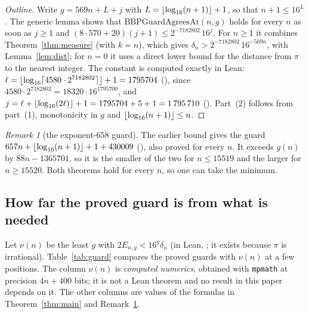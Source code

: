\documentclass[11pt]{amsart}
\theoremstyle{definition}
\theoremstyle{remark}
\newtheorem{remark}[theorem]{Remark}
\newcommand{\Eng}{E_{n,g}}
\newcommand{\dist}{\delta}
\newcommand{\need}{\nu}
\DeclarePairedDelimiter{\floor}{\lfloor}{\rfloor}
\newcommand{\Bconst}{1\,795\,710}
\begin{document}
\begin{proof}[Outline]
Write $g=569n+L+j$ with $L=\floor{\log_{16}(n+1)}+1$, so that
$n+1\le16^L$. The generic lemma  shows that
$\mathrm{BBPGuardAgreesAt}(n,g)$ holds for every $n$ as soon as $j\ge1$ and
$(8\cdot570+20)(j+1)\le2^{-7182802}\,16^{j}$. For $n\ge1$ it combines
Theorem~\ref{thm:measure} (with $k=n$), which gives
$\dist_n>2^{-7182802}\,16^{-569n}$, with Lemma~\ref{lem:dist}; for $n=0$ it
uses a direct lower bound for the distance from $\pi$ to the nearest
integer. The constant is computed exactly in Lean:
$\ell=\floor{\log_{16}\lceil4580\cdot2^{7182802}\rceil}+1=1795704$
(), since $4580\cdot2^{7182802}=18320\cdot16^{1795700}$,
and $j=\ell+\floor{\log_{16}(2\ell)}+1=1795704+5+1=\Bconst$
(). Part~(2) follows from part~(1), monotonicity
in $g$ and $\floor{\log_{16}(n+1)}\le n$.
\end{proof}

\begin{remark}[the exponent-$658$ guard]\label{rem:658}
The earlier bound gives the guard
$657n+\floor{\log_{16}(n+1)}+1+430009$ (), also
proved for every $n$. It exceeds $g(n)$ by $88n-1365701$, so it is the smaller
of the two for $n\le15519$ and the larger for $n\ge15520$. Both theorems
hold for every $n$, so one can take the minimum.
\end{remark}

\subsection*{How far the proved guard is from what is needed}
Let $\need(n)$ be the least $g$ with $2\Eng<16^g\dist_n$ (in Lean,
; it exists because $\pi$ is irrational). Table~\ref{tab:guard}
compares the proved guards with $\need(n)$ at a few positions. The column
$\need(n)$ is \emph{computed numerics}, obtained with \texttt{mpmath} at
precision $4n+400$ bits; it is not a Lean theorem and no result in this paper
depends on it. The other columns are values of the formulas in
Theorem~\ref{thm:main} and Remark~\ref{rem:658}.
\end{document}
